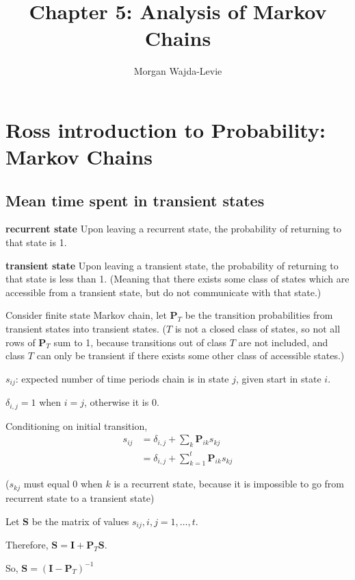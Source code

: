 \documentclass{article}
\title{Chapter 5: Analysis of Markov Chains}
\author{Morgan Wajda-Levie}
\newcommand\M[1]{\textbf{#1}}
\begin{document}
\setcounter{section}{3}
\section{Ross introduction to Probability: Markov Chains}
\setcounter{subsection}{5}

\subsection{Mean time spent in transient states}

\begin{definition}
    \item[\textbf{recurrent state}] Upon leaving a recurrent state, the
        probability of returning to that state is 1.
    \item[\textbf{transient state}] Upon leaving a transient state, the
        probability of returning to that state is less than 1. (Meaning
        that there exists some class of states which are accessible from
        a transient state, but do not communicate with that state.)
\end{definition}


\newcommand\PT{\textbf{P}_T}
Consider finite state Markov chain, let $\PT$ be the transition
probabilities from transient states into transient states. ($T$ is not a
closed class of states, so not all rows of $\PT$ sum to 1, because
transitions out of class $T$ are not included, and class $T$ can only be
transient if there exists some other class of accessible states.)

$s_{ij}$: expected number of time periods chain is in state $j$, given
start in state $i$.

$\delta_{i,j} = 1$ when $i=j$, otherwise it is $0$.

Conditioning on initial transition,
\begin{align*}
    s_{ij} &= \delta_{i,j} + \sum_k \textbf{P}_{ik}s_{kj} \\
           &= \delta_{i,j} + \sum_{k=1}^t \textbf{P}_{ik}s_{kj}
\end{align*}

($s_{kj}$ must equal $0$ when $k$ is a recurrent state, because it is
impossible to go from recurrent state to a transient state)

Let $\M S$ be the matrix of values $s_{ij},i,j=1,\ldots,t$.

Therefore, $\M S = \M I + \PT \M S$.

So, $\M S = (\M I - \PT)^{-1}$
\end{document}
